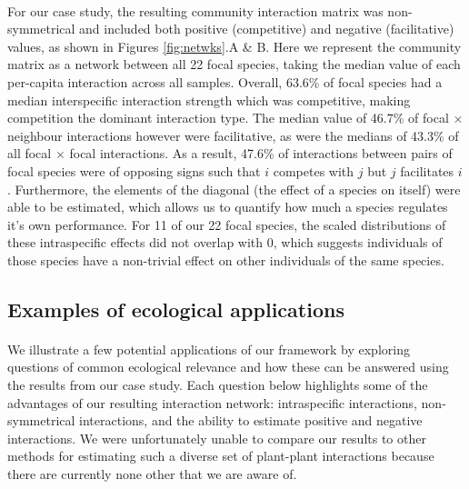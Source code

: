 \documentclass[a4,12pt]{article}
\begin{document}
    \paragraph{}
    For our case study, the resulting community interaction matrix was non-symmetrical and included both positive (competitive) and negative (facilitative) values, as shown in Figures \ref{fig:netwks}.A \& B. Here we represent the community matrix as a network between all 22 focal species, taking the median value of each per-capita interaction  across all samples. Overall, 63.6\% of focal species had a median interspecific interaction strength which was competitive, making competition the dominant interaction type. The median value of 46.7\% of focal $\times$ neighbour interactions however were facilitative, as were the medians of 43.3\% of all focal $\times$ focal interactions. As a result, 47.6\% of interactions between pairs of focal species were of opposing signs such that $i$ competes with $j$ but $j$ facilitates $i$. Furthermore, the elements of the diagonal (the effect of a species on itself) were able to be estimated, which allows us to quantify how much a species regulates it's own performance. For 11 of our 22 focal species, the scaled distributions of these intraspecific effects did not overlap with 0, which suggests individuals of those species have a non-trivial effect on other individuals of the same species.




    \subsection{Examples of ecological applications}

    \paragraph{}
    We illustrate a few potential applications of our framework by exploring questions of common ecological relevance and how these can be answered using the results from our case study. Each question below highlights some of the advantages of our resulting interaction network: intraspecific interactions, non-symmetrical interactions, and the ability to estimate positive and negative interactions. We were unfortunately unable to compare our results to other methods for estimating such a diverse set of plant-plant interactions because there are currently none other that we are aware of.
\end{document}
